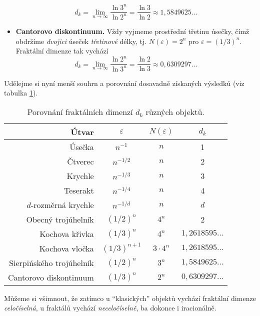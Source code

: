 \begin{itemize}
    \begin{equation}\label{eq:sierpinskeho-trojuhelnik-dimenze}
        d_k=\lim_{n\to\infty}{\dfrac{\ln{3^n}}{\ln{2^{n}}}}=\dfrac{\ln{3}}{\ln{2}}\approx 1{,}5849625\dots
    \end{equation}
    \item \textbf{Cantorovo diskontinuum.} Vždy vyjmeme prostřední třetinu úsečky, čímž obdržíme \emph{dvojici} úseček \emph{třetinové} délky, tj. $N(\varepsilon)=2^n$ pro $\varepsilon=(1/3)^n$. Fraktální dimenze tak vychází
    \begin{equation}\label{eq:cantorovo-diskontinuum-dimenze}
        d_k=\lim_{n\to\infty}{\dfrac{\ln{2^n}}{\ln{3^n}}}=\dfrac{\ln{2}}{\ln{3}}\approx 0{,}6309297\dots
    \end{equation}
\end{itemize}
Udělejme si nyní menší souhrn a porovnání dosavadně získaných výsledků (viz tabulka \ref{table:fraktaly-eukleides-dimenze}).
\begin{table}[h]
    \centering
    \begin{tabular}{r|ccc}
        Útvar                    & $\varepsilon$ & $N(\varepsilon)$ & $d_k$              \\ \hline
        Úsečka                   & $n^{-1}$      & $n$              & 1                  \\
        Čtverec                  & $n^{-1/2}$    & $n$              & 2                  \\
        Krychle                  & $n^{-1/3}$    & $n$              & 3                  \\
        Teserakt                 & $n^{-1/4}$    & $n$              & 4                  \\
        $d$-rozměrná krychle     & $n^{-1/d}$    & $n$              & $d$                \\
        Obecný trojúhelník       & $(1/2)^n$     & $4^n$            & 2                  \\
        Kochova křivka           & $(1/3)^n$     & $4^n$            & $1{,}2618595\dots$ \\
        Kochova vločka           & $(1/3)^{n+1}$ & $3\cdot 4^n$     & $1{,}2618595\dots$ \\
        Sierpińského trojúhelník & $(1/2)^n$     & $3^n$            & $1{,}5849625\dots$ \\
        Cantorovo diskontinuum   & $(1/3)^n$     & $2^n$            & $0{,}6309297\dots$ \\
    \end{tabular}
    \caption{Porovnání fraktálních dimenzí $d_k$ různých objektů.}
    \label{table:fraktaly-eukleides-dimenze}
\end{table}
Můžeme si všimnout, že zatímco u ``klasických'' objektů vychází fraktální dimenze \emph{celočíselná}, u fraktálů vychází \emph{neceločíselně}, ba dokonce i iracionálně.

